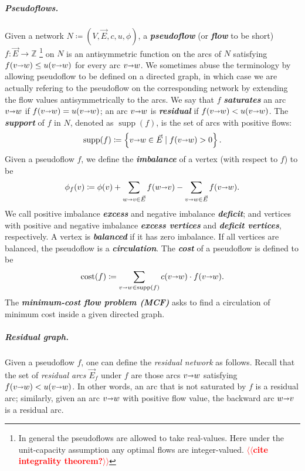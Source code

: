 \documentclass[a4paper,UKenglish]{socg-lipics-v2018}
\makeatletter
\def\note#1{\textcolor{red}{{#1}}}
\def\ints{\mathbb{Z}}
\def\Set#1{\left\{ #1 \right\}}
\def\fsupply{\phi}
\def\arcto{\mathord\shortrightarrow}
\def\arc#1#2{#1\arcto#2}
\def\cost{\operatorname{cost}}
\def\supp{\operatorname{supp}}
\theoremstyle{plain}
\numberwithin{figure}{section}
\renewcommand{\paragraph}{\subparagraph}
\def\EMPH#1{\textbf{\emph{\boldmath #1}}}
\def\n@te#1{\textsf{\boldmath \textbf{$\langle\!\langle$#1$\rangle\!\rangle$}}\leavevmode}
\def\note#1{\textcolor{red}{\n@te{#1}}}
\makeatother
\begin{document}
\paragraph{Pseudoflows.}
Given a network $N \coloneqq (V,\vec{E},c,u,\fsupply)$,
a \EMPH{pseudoflow} (or \EMPH{flow} to be short) $f\colon \vec{E} \to \ints$%
\footnote{In general the pseudoflows are allowed to take real-values.  Here under the unit-capacity assumption any optimal flows are integer-valued. \note{cite integrality theorem?}}
on $N$ is an antisymmetric function on the arcs of $N$ satisfying $f(\arc vw) \leq u(\arc vw)$ for every arc $\arc vw$.%
%
We sometimes abuse the terminology by allowing pseudoflow to be defined on a directed graph, in which case we are actually refering to the pseudoflow on the corresponding network by extending the flow values antisymmetrically to the arcs.
%
We say that $f$ \EMPH{saturates} an arc $\arc vw$ if $f(\arc vw) = u(\arc vw)$; an arc $\arc vw$ is \EMPH{residual} if $f(\arc vw) < u(\arc vw)$.
The \EMPH{support} of $f$ in $N$, denoted as \EMPH{$\supp(f)$}, is the set of arcs with positive flows:
\[
\supp(f) \coloneqq \Set{\arc vw \in \vec{E} \mid f(\arc vw) > 0}.
\]
%
Given a pseudoflow $f$, we define the \EMPH{imbalance} of a vertex (with respect to $f$) to be
\[
\EMPH{$\fsupply_f(v)$} \coloneqq \fsupply(v) + \sum_{\arc wv \in \vec{E}}{f(\arc wv)} - \sum_{\arc vw \in \vec{E}}{f(\arc vw)}.
\]
We call positive imbalance \EMPH{excess} and negative imbalance \EMPH{deficit};
and vertices with positive and negative imbalance \EMPH{excess vertices} and
\EMPH{deficit vertices}, respectively.
A vertex is \EMPH{balanced} if it has zero imbalance.
If all vertices are balanced, the pseudoflow is a \EMPH{circulation}.
The \EMPH{cost} of a pseudoflow
is defined to be
\[
 \EMPH{$\cost(f)$} \coloneqq \sum_{\arc vw \in \supp(f)} c(\arc vw) \cdot f(\arc vw).
\]
%
The \EMPH{minimum-cost flow problem (MCF)} asks to find a circulation of minimum cost inside a given directed graph.

\paragraph{Residual graph.}
Given a pseudoflow $f$, one can define the \emph{residual network} as follows.
%
Recall that the set of \emph{residual arcs $\vec{E}_f$} under $f$ are those arcs $\arc vw$ satisfying $f(\arc vw) < u(\arc vw)$.  In other words, an arc that is not saturated by $f$ is a residual arc; similarly, given an arc $\arc vw$ with positive flow value, the backward arc $\arc wv$ is a residual arc.
\end{document}

